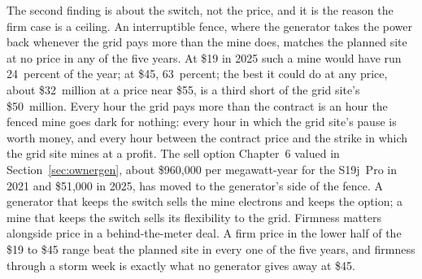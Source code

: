 The second finding is about the switch, not the price, and it is the reason the firm case is a ceiling. An interruptible fence, where the generator takes the power back whenever the grid pays more than the mine does, matches the planned site at no price in any of the five years. At \$19 in 2025 such a mine would have run 24~percent of the year; at \$45, 63~percent; the best it could do at any price, about \$32~million at a price near \$55, is a third short of the grid site's \$50~million. %
Every hour the grid pays more than the contract is an hour the fenced mine goes dark for nothing: every hour in which the grid site's pause is worth money, and every hour between the contract price and the strike in which the grid site mines at a profit. The sell option Chapter~6 valued in Section~\ref{sec:ownergen}, about \$960,000 per megawatt-year for the S19j~Pro in 2021 and \$51,000 in 2025, has moved to the generator's side of the fence. %
A generator that keeps the switch sells the mine electrons and keeps the option; a mine that keeps the switch sells its flexibility to the grid.
Firmness matters alongside price in a behind-the-meter deal. A firm price in the lower half of the \$19 to \$45 range beat the planned site in every one of the five years, and firmness through a storm week is exactly what no generator gives away at \$45. %

